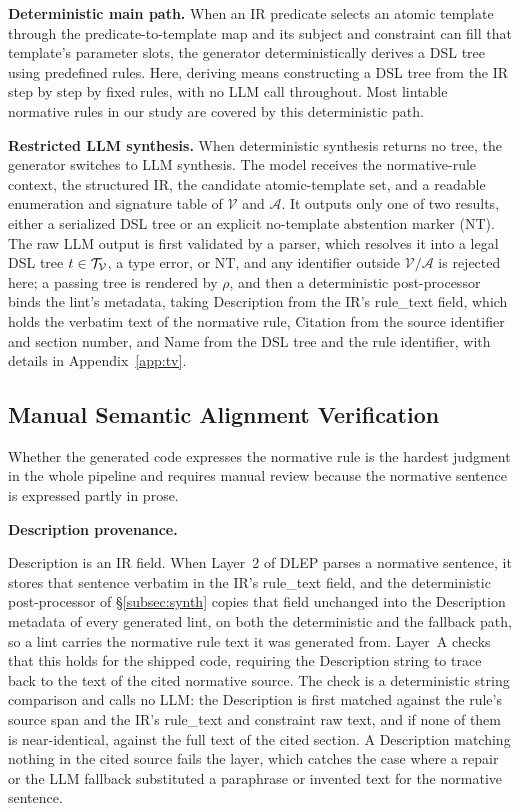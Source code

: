 \textbf{Deterministic main path.} When an IR predicate selects an atomic
template through the predicate-to-template map and its subject and constraint can fill that template's
parameter slots, the generator deterministically derives a DSL tree using
predefined rules. Here, deriving means constructing a DSL tree from the IR step by
step by fixed rules, with no LLM call throughout. Most lintable normative rules in our
study are covered by this deterministic path.

\textbf{Restricted LLM synthesis.} When deterministic synthesis returns no tree,
the generator switches to LLM synthesis. The model receives the normative-rule context,
the structured IR, the candidate atomic-template set, and a readable enumeration
and signature table of $\mathcal{V}$ and $\mathcal{A}$. It
outputs only one of two results, either a serialized DSL tree or an explicit
no-template abstention marker (NT). The raw LLM
output is first validated by a parser, which resolves it into
a legal DSL tree $t \in \mathcal{T}_{\mathcal{V}}$, a type error, or NT, and any
identifier outside $\mathcal{V}/\mathcal{A}$ is rejected here; a passing tree is
rendered by $\rho$, and then a deterministic post-processor
binds the lint's metadata, taking Description from the IR's rule\_text field,
which holds the verbatim text of the normative rule, Citation from the source
identifier and section number, and Name from the DSL tree and the rule
identifier, with details in Appendix~\ref{app:tv}.

\subsection{Manual Semantic Alignment Verification}

Whether the generated code expresses the normative rule is the hardest judgment
in the whole pipeline and requires manual review because the normative sentence
is expressed partly in prose.

\noindent\textbf{Description provenance.}\par\noindent Description is an IR field. When Layer~2 of DLEP parses a normative sentence, it stores that
sentence verbatim in the IR's rule\_text field, and the deterministic
post-processor of \S\ref{subsec:synth} copies that field unchanged into the
Description metadata of every generated lint, on both the deterministic and the
fallback path, so a lint carries the normative rule
text it was generated from. Layer~A checks that this holds for the shipped
code, requiring the Description string to trace back to the text of the cited
normative source. The check is a deterministic string comparison and calls no
LLM: the Description is first matched against the rule's source span and the
IR's rule\_text and constraint raw text, and if none of them is near-identical,
against the full text of the cited section. A Description
matching nothing in the cited source fails the layer, which catches the case
where a repair or the LLM fallback substituted a paraphrase or invented text for
the normative sentence.

